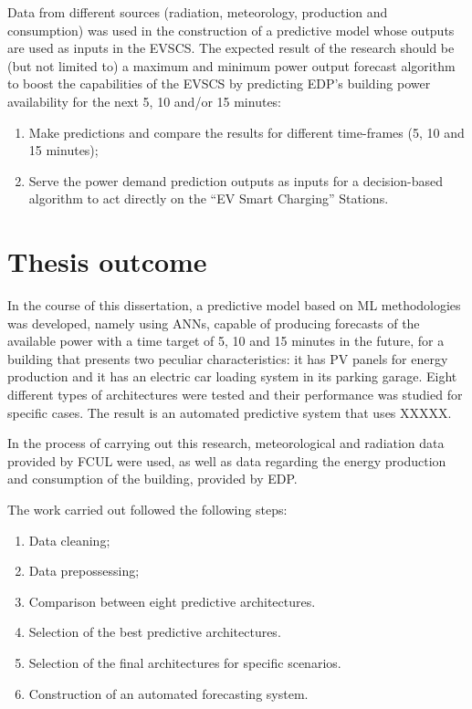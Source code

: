 Data from different sources (radiation, meteorology, production and consumption) was used in the construction of a predictive model whose outputs are used as inputs in the \ac{EVSCS}. The expected result of the research should be (but not limited to) a maximum and minimum power output forecast algorithm to boost the capabilities of the \ac{EVSCS} by predicting \ac{EDP}'s building power availability for the next 5, 10 and/or 15 minutes:
\begin{enumerate}[noitemsep,topsep=0pt]
  \itemsep0em 
  \item Make predictions and compare the results for different time-frames (5, 10 and 15 minutes);
  \item Serve the power demand prediction outputs as inputs for a decision-based algorithm to act directly on the “\ac{EV} Smart Charging” Stations.
\end{enumerate}   



\section{Thesis outcome}


In the course of this dissertation, a predictive model based on \ac{ML} methodologies was developed, namely using \ac{ANN}s, capable of producing forecasts of the available power with a time target of 5, 10 and 15 minutes in the future, for a building that presents two peculiar characteristics: it has  \ac{PV} panels for energy production and it has an electric car loading system in its parking garage. Eight different types of architectures were tested and their performance was studied for specific cases. The result is an automated predictive system that uses XXXXX.

In the process of carrying out this research, meteorological and radiation data provided by \ac{FCUL} were used, as well as data regarding the energy production and consumption of the building, provided by \ac{EDP}.

The work carried out followed the following steps:
\begin{enumerate}[noitemsep,topsep=0pt]
  \itemsep0em 
  \item Data cleaning;
  \item Data prepossessing;
  \item Comparison between eight predictive architectures.
  \item Selection of the best predictive architectures.
  \item Selection of the final architectures for specific scenarios.
  \item Construction of an automated forecasting system.
\end{enumerate}


